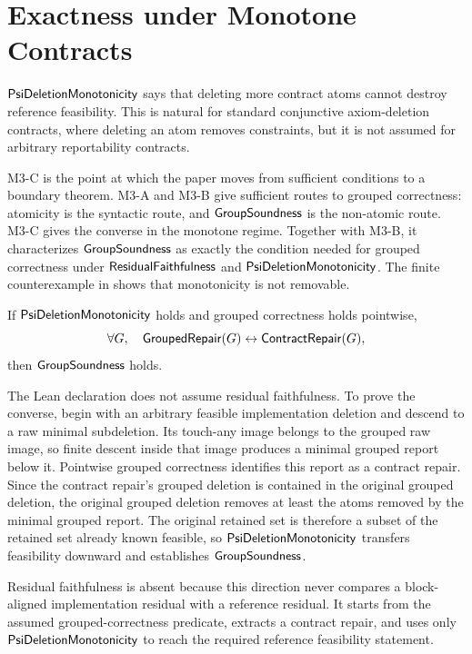 \section{Exactness under Monotone Contracts}
\label{sec:monotone}

\(\mathsf{PsiDeletionMonotonicity}\) says that deleting more contract atoms cannot
destroy reference feasibility.  This is natural for standard conjunctive
axiom-deletion contracts, where deleting an atom removes constraints, but it is
not assumed for arbitrary reportability contracts.

M3-C is the point at which the paper moves from sufficient conditions to a
boundary theorem.  M3-A and M3-B give sufficient routes to grouped correctness:
atomicity is the syntactic route, and \(\mathsf{GroupSoundness}\) is the non-atomic
route.  M3-C gives the converse in the monotone regime.  Together with M3-B,
it characterizes \(\mathsf{GroupSoundness}\) as exactly the condition needed for
grouped correctness under \(\mathsf{ResidualFaithfulness}\) and
\(\mathsf{PsiDeletionMonotonicity}\).  The finite counterexample in
 shows that monotonicity is not removable.

\begin{theorem}
\label{thm:m3c}
If \(\mathsf{PsiDeletionMonotonicity}\) holds and grouped correctness holds pointwise,
\[
  \forall G,\quad
  \mathsf{GroupedRepair}(G)\leftrightarrow\mathsf{ContractRepair}(G),
\]
then \(\mathsf{GroupSoundness}\) holds.
\end{theorem}

The Lean declaration  does not assume residual faithfulness.
To prove the converse, begin with an arbitrary feasible implementation
deletion and descend to a raw minimal subdeletion.  Its touch-any image belongs
to the grouped raw image, so finite descent inside that image produces a
minimal grouped report below it.  Pointwise grouped correctness identifies
this report as a contract repair.  Since the contract repair's grouped
deletion is contained in the original grouped deletion, the original grouped
deletion removes at least the atoms removed by the minimal grouped report.  The
original retained set is therefore a subset of the retained set already known
feasible, so \(\mathsf{PsiDeletionMonotonicity}\) transfers feasibility downward and
establishes \(\mathsf{GroupSoundness}\).

Residual faithfulness is absent because this direction never compares a
block-aligned implementation residual with a reference residual.  It starts
from the assumed grouped-correctness predicate, extracts a contract repair,
and uses only \(\mathsf{PsiDeletionMonotonicity}\) to reach the required reference
feasibility statement.

